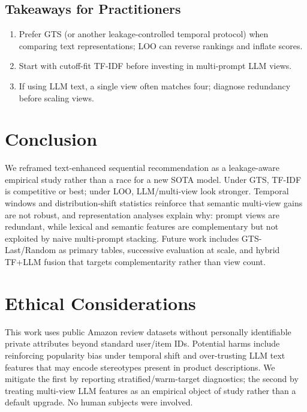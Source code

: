 \documentclass[sigconf,natbib=true,anonymous]{acmart}
\newcommand{\tfidf}{\textsc{TF-IDF}\xspace}
\newcommand{\llm}{\textsc{LLM}\xspace}
\begin{document}
\subsection{Takeaways for Practitioners}
\begin{enumerate}[leftmargin=*,itemsep=2pt]
\item Prefer GTS (or another leakage-controlled temporal protocol) when comparing text representations; LOO can reverse rankings and inflate scores.
\item Start with cutoff-fit \tfidf before investing in multi-prompt \llm views.
\item If using \llm text, a single view often matches four; diagnose redundancy before scaling views.
\end{enumerate}

\section{Conclusion}

We reframed text-enhanced sequential recommendation as a leakage-aware empirical study rather than a race for a new SOTA model.
Under GTS, \tfidf is competitive or best; under LOO, \llm/multi-view look stronger.
Temporal windows and distribution-shift statistics reinforce that semantic multi-view gains are not robust, and representation analyses explain why: prompt views are redundant, while lexical and semantic features are complementary but not exploited by naive multi-prompt stacking.
Future work includes GTS-Last/Random as primary tables, successive evaluation at scale, and hybrid TF+\llm fusion that targets complementarity rather than view count.

\section*{Ethical Considerations}
This work uses public Amazon review datasets without personally identifiable private attributes beyond standard user/item IDs.
Potential harms include reinforcing popularity bias under temporal shift and over-trusting LLM text features that may encode stereotypes present in product descriptions.
We mitigate the first by reporting stratified/warm-target diagnostics; the second by treating multi-view LLM features as an empirical object of study rather than a default upgrade.
No human subjects were involved.
\end{document}
